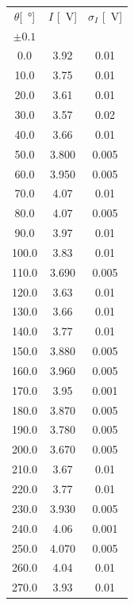 \documentclass[10pt,oneside,a4paper]{article}
\begin{document}
\begin{minipage}[t]{0.3\linewidth}
\begin{center}
\label{tab:align}
\begin{tabular}{c|c|c}
\toprule
$\theta$[\SI{}{\degree}] &  $I$ [\SI{}{V}] &  $\sigma_{I}$ [\SI{}{V}] \\
     $\pm 0.1$ & & \\
\midrule
0.0 &    3.92 &            0.01 \\
10.0 &    3.75 &            0.01 \\
20.0 &    3.61 &            0.01 \\
30.0 &    3.57 &            0.02 \\
40.0 &    3.66 &            0.01 \\
50.0 &    3.800 &            0.005 \\
60.0 &    3.950 &            0.005 \\
70.0 &    4.07 &            0.01 \\
80.0 &    4.07 &            0.005 \\
90.0 &    3.97 &            0.01 \\
100.0 &    3.83 &            0.01 \\
110.0 &    3.690 &            0.005 \\
120.0 &    3.63 &            0.01 \\
130.0 &    3.66 &            0.01 \\
140.0 &    3.77 &            0.01 \\
150.0 &    3.880 &            0.005 \\
160.0 &    3.960 &            0.005 \\
170.0 &    3.95 &            0.001 \\
180.0 &    3.870 &            0.005 \\
190.0 &    3.780 &            0.005 \\
200.0 &    3.670 &            0.005 \\
210.0 &    3.67 &            0.01 \\
220.0 &    3.77 &            0.01 \\
230.0 &    3.930 &            0.005 \\
240.0 &    4.06 &            0.001 \\
250.0 &    4.070 &            0.005 \\
260.0 &    4.04 &            0.01 \\
270.0 &    3.93 &            0.01 \\

\end{tabular}
\end{center}
\end{minipage}
\end{document}
